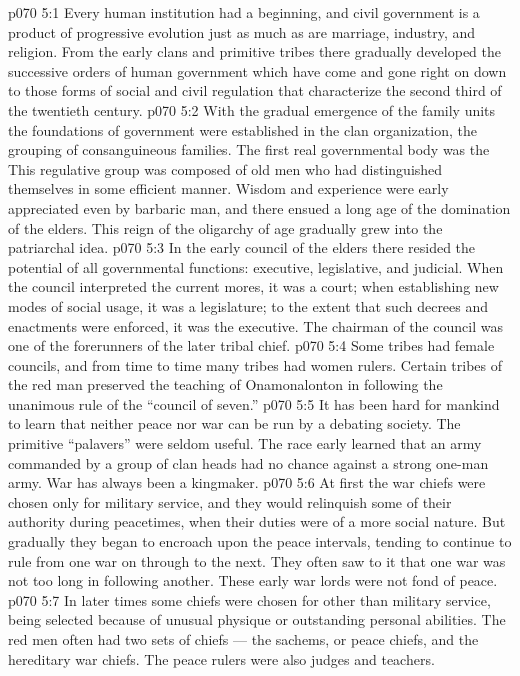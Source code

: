 \vs p070 5:1 Every human institution had a beginning, and civil government is a product of progressive evolution just as much as are marriage, industry, and religion. From the early clans and primitive tribes there gradually developed the successive orders of human government which have come and gone right on down to those forms of social and civil regulation that characterize the second third of the twentieth century.
\vs p070 5:2 With the gradual emergence of the family units the foundations of government were established in the clan organization, the grouping of consanguineous families. The first real governmental body was the  This regulative group was composed of old men who had distinguished themselves in some efficient manner. Wisdom and experience were early appreciated even by barbaric man, and there ensued a long age of the domination of the elders. This reign of the oligarchy of age gradually grew into the patriarchal idea.
\vs p070 5:3 In the early council of the elders there resided the potential of all governmental functions: executive, legislative, and judicial. When the council interpreted the current mores, it was a court; when establishing new modes of social usage, it was a legislature; to the extent that such decrees and enactments were enforced, it was the executive. The chairman of the council was one of the forerunners of the later tribal chief.
\vs p070 5:4 Some tribes had female councils, and from time to time many tribes had women rulers. Certain tribes of the red man preserved the teaching of Onamonalonton in following the unanimous rule of the “council of seven.”
\vs p070 5:5 \pc It has been hard for mankind to learn that neither peace nor war can be run by a debating society. The primitive “palavers” were seldom useful. The race early learned that an army commanded by a group of clan heads had no chance against a strong one\hyp{}man army. War has always been a kingmaker.
\vs p070 5:6 \pc At first the war chiefs were chosen only for military service, and they would relinquish some of their authority during peacetimes, when their duties were of a more social nature. But gradually they began to encroach upon the peace intervals, tending to continue to rule from one war on through to the next. They often saw to it that one war was not too long in following another. These early war lords were not fond of peace.
\vs p070 5:7 In later times some chiefs were chosen for other than military service, being selected because of unusual physique or outstanding personal abilities. The red men often had two sets of chiefs --- the sachems, or peace chiefs, and the hereditary war chiefs. The peace rulers were also judges and teachers.
